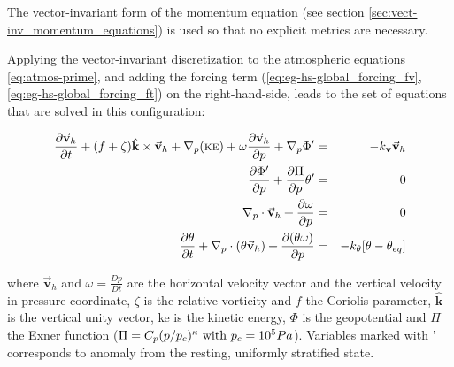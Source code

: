 The vector-invariant form of the momentum equation (see section
\ref{sec:vect-inv_momentum_equations}) is used so that no explicit 
metrics are necessary.

Applying the vector-invariant discretization to the
atmospheric equations \ref{eq:atmos-prime}, and adding the 
forcing term 
(\ref{eq:eg-hs-global_forcing_fv}, \ref{eq:eg-hs-global_forcing_ft})
on the right-hand-side,
leads to the set of equations that are solved in this configuration:


\begin{eqnarray}
\label{eq:eg-hs-model_equations}
\frac{\partial \vec{\mathbf{v}}_h}{\partial t}
+(f + \zeta)\hat{\mathbf{k}} \times \vec{\mathbf{v}}_h
+\mathbf{\nabla }_{p} (\mbox{\sc ke})
+ \omega \frac{\partial \vec{\mathbf{v}}_h }{\partial p}
+\mathbf{\nabla }_p \Phi ^{\prime } 
&=& 
-k_\mathbf{v}\vec{\mathbf{v}}_h
\\
\frac{\partial \Phi ^{\prime }}{\partial p} 
+\frac{\partial \Pi }{\partial p}\theta ^{\prime } &=&0
\\
\mathbf{\nabla }_{p}\cdot \vec{\mathbf{v}}_h+\frac{\partial \omega }{
\partial p} &=&0
\\
\frac{\partial \theta }{\partial t} 
+ \mathbf{\nabla }_{p}\cdot (\theta \vec{\mathbf{v}}_h)
+ \frac{\partial (\theta \omega)}{\partial p}
&=& -k_{\theta}[\theta-\theta_{eq}]
\end{eqnarray}


\noindent where $\vec{\mathbf{v}}_h$ and $\omega = \frac{Dp}{Dt}$ 
are the horizontal velocity vector and the vertical velocity in pressure coordinate,
$\zeta$ is the relative vorticity and $f$ the Coriolis parameter, 
$\hat{\mathbf{k}}$ is the vertical unity vector, 
{\sc ke} is the kinetic energy, $\Phi$ is the geopotential
and $\Pi$ the Exner function 
($\Pi = C_p (p/p_c)^\kappa ~{\rm with}~ p_c = 10^5 Pa$).
Variables marked with ' corresponds to anomaly from 
the resting, uniformly stratified state.

